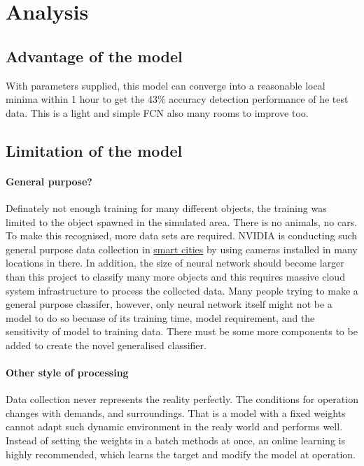 \documentclass[paper=a4, fontsize=11pt]{scrartcl} %
\numberwithin{equation}{section} %
\numberwithin{figure}{section} %
\numberwithin{table}{section} %
\begin{document}
\section{Analysis}
\subsection{Advantage of the model}
With parameters supplied, this model can converge into a reasonable local minima within 1 hour to get the 43\% accuracy detection performance of he test data. This is a light and simple FCN also many rooms to improve too.

\subsection{Limitation of the model}\label{rubric50}
\paragraph{General purpose?}
Definately not enough training for many different objects, the training was limited to the object spawned in the simulated area. There is no animals, no cars. To make this recognised, more data sets are required. NVIDIA is conducting such general purpose data collection in \href{https://www.nvidia.com/en-us/deep-learning-ai/industries/ai-cities/}{smart cities} by using cameras installed in many locations in there. In addition, the size of neural network should become larger than this project to classify many more objects and this requires massive cloud system infrastructure to process the collected data.
Many people trying to make a general purpose classifer, however, only neural network itself might not be a model to do so becuase of its training time, model requirement, and the sensitivity of model to training data. There must be some more components to be added to create the novel generalised classifier.
\paragraph{Other style of processing}
Data collection never represents the reality perfectly. The conditions for operation changes with demands, and surroundings. That is a model with a fixed weights cannot adapt such dynamic environment in the realy world and performs well. Instead of setting the weights in a batch methods at once, an online learning is highly recommended, which learns the target and modify the model at operation.
\newpage
\end{document}
